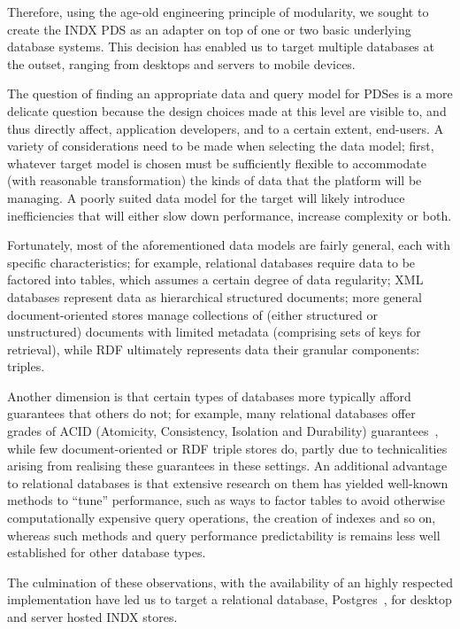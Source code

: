 \documentclass[graybox]{svmult}
\begin{document}
Therefore, using the age-old engineering principle of modularity, we sought to create the INDX PDS as an adapter on top of one or two basic underlying database systems.  This decision has enabled us to target multiple databases at the outset, ranging from desktops and servers to mobile devices. 

The question of finding an appropriate data and query model for PDSes is a more delicate question because the design choices made at this level are visible to, and thus directly affect, application developers, and to a certain extent, end-users.  A variety of considerations need to be made when selecting the data model; first, whatever target model is chosen must be sufficiently flexible to accommodate (with reasonable transformation) the kinds of data that the platform will be managing.  A poorly suited data model for the target will likely introduce inefficiencies that will either slow down performance, increase complexity or both.

Fortunately, most of the aforementioned data models are fairly general, each with specific characteristics; for example, relational databases require data to be factored into tables, which assumes a certain degree of data regularity; XML databases represent data as hierarchical structured documents; more general document-oriented stores manage collections of (either structured or unstructured) documents with limited metadata (comprising sets of keys for retrieval), while RDF ultimately represents data their granular components: triples.  

Another dimension is that certain types of databases more typically afford guarantees that others do not; for example, many relational databases offer grades of ACID (Atomicity, Consistency, Isolation and Durability) guarantees~\cite{muth1991atomic}, while few document-oriented or RDF triple stores do, partly due to technicalities arising from realising these guarantees in these settings.  An additional advantage to relational databases is that extensive research on them has yielded well-known methods to “tune” performance, such as ways to factor tables to avoid otherwise computationally expensive query operations, the creation of indexes and so on, whereas such methods and query performance predictability is remains less well established for other database types.

The culmination of these observations, with the availability of an highly respected implementation have led us to target a relational database, Postgres~\cite{stonebraker1986design}, for desktop and server hosted INDX stores.  
\end{document}
